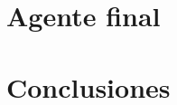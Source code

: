 \documentclass[12pt]{article}
\begin{document}
\section{Agente final}




\section{Conclusiones}
\end{document}
